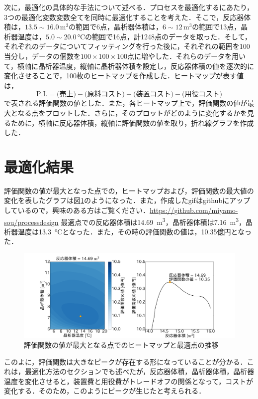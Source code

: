 \documentclass[a4j]{jsreport}
\begin{document}
次に，最適化の具体的な手法について述べる．プロセスを最適化するにあたり，3つの最適化変数変数全てを同時に最適化することを考えた．そこで，反応器体積は，$13.5 \sim 16.0 \, \si{\cubic \metre}$の範囲で6点，晶析器体積は，$6 \sim 12 \, \si{\cubic \metre}$の範囲で13点，晶析器温度は，$5.0 \sim 20.0 \, \si{\degreeCelsius}$の範囲で16点，計1248点のデータを取った．そして，それぞれのデータについてフィッティングを行った後に，それぞれの範囲を100当分し，データの個数を$100 \times 100 \times 100$点に増やした．それらのデータを用いて，横軸に晶析器温度，縦軸に晶析器体積を設定し，反応器体積の値を逐次的に変化させることで，100枚のヒートマップを作成した．ヒートマップが表す値は，
\begin{equation}
  \text{P.I.} = \text{(売上)} - \text{(原料コスト)} - \text{(装置コスト)} -\text{(用役コスト)}
\end{equation}
で表される評価関数の値とした．また，各ヒートマップ上で，評価関数の値が最大となる点をプロットした．さらに，そのプロットがどのように変化するかを見るために，横軸に反応器体積，縦軸に評価関数の値を取り，折れ線グラフを作成した．

\section{最適化結果}
評価関数の値が最大となった点での，ヒートマップおよび，評価関数の最大値の変化を表したグラフは図\ref{最適化結果}のようになった．また，作成したgifはgithubにアップしているので，興味のある方はご覧ください．\url{https://github.com/miyamo-sou/processdesign} 最適点での反応器体積は14.69\, \si{\cubic \metre}，晶析器体積は7.16\, \si{\cubic \metre}，晶析器温度は13.3\, \si{\degreeCelsius}となった．また，その時の評価関数の値は，10.35億円となった．
\begin{figure}[htbp]
  \centering
  \includegraphics[scale=0.1]{snapshot.png}
  \caption{評価関数の値が最大となる点でのヒートマップと最適点の推移}
  \label{最適化結果}
\end{figure}

このよに，評価関数は大きなピークが存在する形になっていることが分かる．これは，最適化方法のセクションでも述べたが，反応器体積，晶析器体積，晶析器温度を変化させると，装置費と用役費がトレードオフの関係となって，コストが変化する．そのため，このようにピークが生じたと考えられる．
\end{document}
